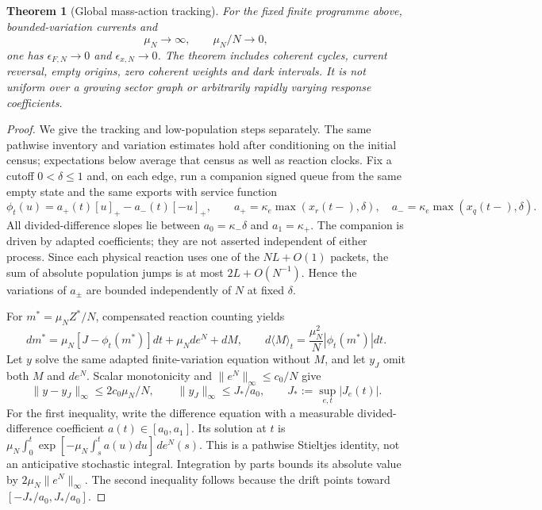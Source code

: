 \documentclass[11pt]{article}
\newtheorem{theorem}{Theorem}[section]
\theoremstyle{definition}\newtheorem{definition}[theorem]{Definition}
\theoremstyle{remark}\newtheorem{remark}[theorem]{Remark}
\begin{document}
\begin{theorem}[Global mass-action tracking]\label{kin:tracking}
For the fixed finite programme above, bounded-variation currents and
\begin{equation}
 \mu_N\longrightarrow\infty,\qquad \mu_N/N\longrightarrow0,
 \label{kin:hierarchy}
\end{equation}
one has $\epsilon_{F,N}\to0$ and $\epsilon_{x,N}\to0$.
The theorem includes coherent cycles, current reversal, empty origins,
zero coherent weights and dark intervals. It is not uniform over a growing
sector graph or arbitrarily rapidly varying response coefficients.
\end{theorem}
\begin{proof}
We give the tracking and low-population steps separately. The same
pathwise inventory and variation estimates hold after conditioning on
the initial census; expectations below average that census as well as
reaction clocks. Fix a cutoff
$0<\delta\le1$ and, on each edge, run a companion signed queue from the same
empty state and the same exports with service function
\[
 \phi_t(u)=a_+(t)[u]_+-a_-(t)[-u]_+,\qquad
 a_+=\kappa_e\max(x_r(t-),\delta),\quad
 a_-=\kappa_e\max(x_q(t-),\delta).
\]
All divided-difference slopes lie between $a_0=\kappa_-\delta$ and
$a_1=\kappa_+$. The companion is driven by adapted coefficients; they are
not asserted independent of either process. Since each physical reaction
uses one of the $NL+O(1)$ packets, the sum of absolute population jumps is
at most $2L+O(N^{-1})$. Hence the variations of $a_\pm$ are bounded
independently of $N$ at fixed $\delta$.

For $m^*=\mu_NZ^*/N$, compensated reaction counting yields
\begin{equation}
 dm^*=\mu_N[J-\phi_t(m^*)]dt+\mu_Nde^N+dM,
 \qquad d\langle M\rangle_t=\frac{\mu_N^2}{N}|\phi_t(m^*)|dt.
 \label{kin:companion}
\end{equation}
Let $y$ solve the same adapted finite-variation equation without $M$, and
let $y_J$ omit both $M$ and $de^N$. Scalar monotonicity and
$\|e^N\|_\infty\le c_0/N$ give
\begin{equation}
 \|y-y_J\|_\infty\le2c_0\mu_N/N,\qquad
 \|y_J\|_\infty\le J_*/a_0,\qquad J_*:=\sup_{e,t}|J_e(t)|.
 \label{kin:dettracking}
\end{equation}
For the first inequality, write the difference equation with a measurable
divided-difference coefficient $a(t)\in[a_0,a_1]$. Its solution at $t$
is $\mu_N\int_0^t\exp[-\mu_N\int_s^t a(u)du]\,de^N(s)$.
This is a pathwise Stieltjes identity, not an anticipative stochastic
integral. Integration by parts bounds its absolute value by
$2\mu_N\|e^N\|_\infty$. The second inequality follows because the drift
points toward $[-J_*/a_0,J_*/a_0]$.


\end{proof}
\end{document}
